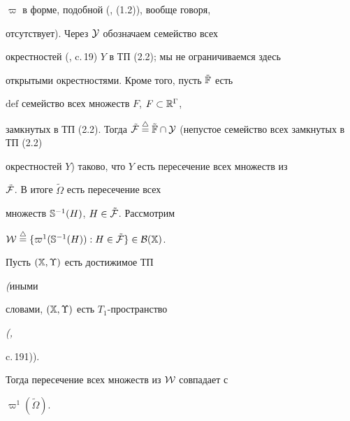 $\varpi$ в форме, подобной (\cite{Ch5}, (1.2)), вообще говоря,


отсутствует). Через ${\cal Y}$ обозначаем семейство всех


окрестностей (\cite{Bou}, c.\,19) $Y$ в ТП (2.2); мы не ограничиваемся здесь


открытыми окрестностями. Кроме того, пусть $\tilde{\Bbb F}$ есть


$\mathrm{def}$ семейство всех множеств $F$, $F \subset {\Bbb R}^\Gamma$,


замкнутых в ТП (2.2). Тогда $\tilde{\cal F} \stac \tilde{\Bbb F}


\cap {\cal Y}$ (непустое семейство всех замкнутых в ТП (2.2)


окрестностей $Y$) таково, что $Y$ есть пересечение всех множеств из


$\tilde{\cal F}$. В итоге $\tilde\Omega$ есть пересечение всех


множеств ${\Bbb S}^{-1}(H)$, $H \in \tilde{\cal F}$. Рассмотрим


${\cal W}


\stac \{\varpi^1({\Bbb S}^{-1}(H)): H \in \tilde{\cal F}\} \in {\cal


B}({\Bbb X})$.





\begin{lems} Пусть $({\Bbb X}, \Upsilon)$ есть достижимое ТП


{\em (}иными


словами, $({\Bbb X}, \Upsilon)$ есть $T_1$-простран\-ство {\em (\cite{Ale},


c.\,191)).} Тогда пересечение всех множеств из ${\cal W}$ совпадает с


$\varpi^1(\tilde\Omega).$


\end{lems}






